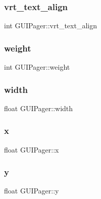 \hypertarget{class_g_u_i_pager_a372c2b5abbac58e4b7a25b72baee808a}{}\label{class_g_u_i_pager_a372c2b5abbac58e4b7a25b72baee808a} 
\subsubsection{\texorpdfstring{vrt\+\_\+text\+\_\+align}{vrt\_text\_align}}
{\footnotesize\ttfamily int G\+U\+I\+Pager\+::vrt\+\_\+text\+\_\+align}

\hypertarget{class_g_u_i_pager_aabe70f828135b7f199f5a09b2b5475cf}{}\label{class_g_u_i_pager_aabe70f828135b7f199f5a09b2b5475cf} 
\subsubsection{\texorpdfstring{weight}{weight}}
{\footnotesize\ttfamily int G\+U\+I\+Pager\+::weight}

\hypertarget{class_g_u_i_pager_a581de10961470c575c33e3ee82d98921}{}\label{class_g_u_i_pager_a581de10961470c575c33e3ee82d98921} 
\subsubsection{\texorpdfstring{width}{width}}
{\footnotesize\ttfamily float G\+U\+I\+Pager\+::width}

\hypertarget{class_g_u_i_pager_ae261b96a15172ac6141472f719cf4aea}{}\label{class_g_u_i_pager_ae261b96a15172ac6141472f719cf4aea} 
\subsubsection{\texorpdfstring{x}{x}}
{\footnotesize\ttfamily float G\+U\+I\+Pager\+::x}

\hypertarget{class_g_u_i_pager_a692c9538b3e5ecb10f94a4e32d0ad711}{}\label{class_g_u_i_pager_a692c9538b3e5ecb10f94a4e32d0ad711} 
\subsubsection{\texorpdfstring{y}{y}}
{\footnotesize\ttfamily float G\+U\+I\+Pager\+::y}

